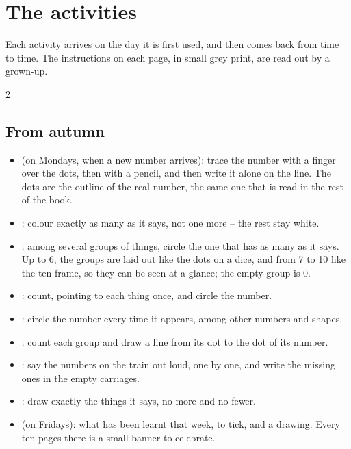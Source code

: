 \section*{The activities}

Each activity arrives on the day it is first used, and then comes back
from time to time. The instructions on each page, in small grey print,
are read out by a grown-up.

{\small
\begin{multicols}{2}
\raggedright
\subsection*{From autumn}
\begin{itemize}[leftmargin=5mm, itemsep=1pt, topsep=0pt]
\item \textbf{\lblTraza} (on Mondays, when a new number arrives): trace
  the number with a finger over the dots, then with a pencil, and then
  write it alone on the line. The dots are the outline of the real
  number, the same one that is read in the rest of the book.
\item \textbf{\lblColorea}: colour exactly as many as it says, not one
  more -- the rest stay white.
\item \textbf{\lblRodea}: among several groups of things, circle the
  one that has as many as it says. Up to 6, the groups are laid out like
  the dots on a dice, and from 7 to 10 like the ten frame, so they can
  be seen at a glance; the empty group is 0.
\item \textbf{\lblCuenta}: count, pointing to each thing once, and
  circle the number.
\item \textbf{\lblBusca}: circle the number every time it appears,
  among other numbers and shapes.
\item \textbf{\lblUne}: count each group and draw a line from its dot to
  the dot of its number.
\item \textbf{\lblCompleta}: say the numbers on the train out loud, one
  by one, and write the missing ones in the empty carriages.
\item \textbf{\lblDibuja}: draw exactly the things it says, no more and
  no fewer.
\item \textbf{\lblRepasa} (on Fridays): what has been learnt that week,
  to tick, and a drawing. Every ten pages there is a small banner to
  celebrate.
\end{itemize}


\end{multicols}}
